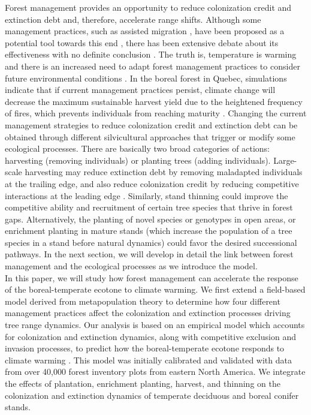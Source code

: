 Forest management provides an opportunity to reduce colonization credit
and extinction debt and, therefore, accelerate range shifts. Although
some management practices, such as assisted migration
\citep{Peters1985a}, have been proposed as a potential tool towards this
end \citep[\emph{e.g.}][]{Gray2011}, there has been extensive debate
about its effectiveness with no definite conclusion
\citep[\emph{e.g.}][]{McLachlan2007, Vila2010, Ricciardi2009, Schwartz2009}.
The truth is, temperature is warming and there is an increased need to
adapt forest management practices to consider future environmental
conditions \citep{Keenan2015, Ameztegui2018}. In the boreal forest in
Quebec, simulations indicate that if current management practices
persist, climate change will decrease the maximum sustainable harvest
yield due to the heightened frequency of fires, which prevents
individuals from reaching maturity \citep{BureauduForestierenChef2020}.
Changing the current management strategies to reduce colonization credit
and extinction debt can be obtained through different silvicultural
approaches that trigger or modify some ecological processes. There are
basically two broad categories of actions: harvesting (removing
individuals) or planting trees (adding individuals). Large-scale
harvesting may reduce extinction debt by removing maladapted individuals
at the trailing edge, and also reduce colonization credit by reducing
competitive interactions at the leading edge
\citep{Leithead2010, Steenberg2013, Brice2020}. Similarly, stand
thinning could improve the competitive ability and recruitment of
certain tree species that thrive in forest gaps. Alternatively, the
planting of novel species or genotypes in open areas, or enrichment
planting in mature stands (which increase the population of a tree
species in a stand before natural dynamics) could favor the desired
successional pathways. In the next section, we will develop in detail
the link between forest management and the ecological processes as we
introduce the model.\\

In this paper, we will study how forest management can accelerate the
response of the boreal-temperate ecotone to climate warming. We first
extend a field-based model derived from metapopulation theory to
determine how four different management practices affect the
colonization and extinction processes driving tree range dynamics. Our
analysis is based on an empirical model which accounts for colonization
and extinction dynamics, along with competitive exclusion and invasion
processes, to predict how the boreal-temperate ecotone responds to
climate warming \citep{Vissault2020}. This model was initially
calibrated and validated with data from over 40,000 forest inventory
plots from eastern North America. We integrate the effects of
plantation, enrichment planting, harvest, and thinning on the
colonization and extinction dynamics of temperate deciduous and boreal
conifer stands.\\

